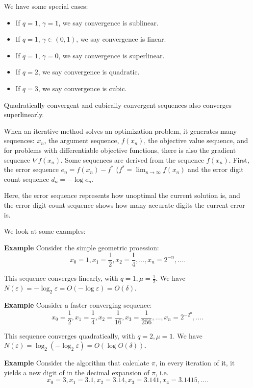 We have some special cases:
\begin{itemize}
\item If \( q = 1 \), \( \gamma = 1 \), we say convergence is sublinear.
\item If \( q = 1 \), \( \gamma \in (0, 1) \), we say convergence is linear.
\item If \( q = 1 \), \( \gamma = 0 \), we say convergence is superlinear.
\item If \( q = 2 \), we say convergence is quadratic.
\item If \( q = 3 \), we say convergence is cubic.
\end{itemize}

Quadratically convergent and cubically convergent sequences also converges
superlinearly.

When an iterative method solves an optimization problem, it generates many
sequences: \( x_{n} \), the argument sequence, \( f(x_{n}) \), the objective
value sequence, and for problems with differentiable objective functions, there
is also the gradient sequence \( \nabla f(x_{n}) \). Some sequences are derived
from the sequence \( f(x_{n}) \). First, the error sequence \( e_{n} = f(x_{n})
- f^{*}\) (\( f^{*} = \lim_{n \to \infty} f(x_{n}) \) and the error digit count
sequence \( d_{n} = -\log e_{n} \).

Here, the error sequence represents how unoptimal the current solution is, and
the error digit count sequence shows how many accurate digits the current error
is.

We look at some examples:

\textbf{Example} Consider the simple geometric proession:
\[
  x_{0} = 1, x_{1} = \frac{1}{2}, x_{2} = \frac{1}{4}, \ldots , x_{n} =
  2^{-n},\ldots 
.\] 

This sequence converges linearly, with \( q = 1, \mu  = \frac{1}{2} \). We have
\( N(\varepsilon) = -\log _{2} \varepsilon = O(-\log \varepsilon) = O(\delta) \).

\textbf{Example} Consider a faster converging sequence:
\[
  x_{0} = \frac{1}{2}, x_{1} = \frac{1}{4}, x_{2} = \frac{1}{16}, x_{3} =
  \frac{1}{256}, \ldots ,x_{n} = 2^{-2^{n}}, \ldots 
.\] 

This sequence converges quadratically, with \( q = 2, \mu  = 1 \). We have \(
N(\varepsilon) = \log_{2} (-\log _{2} \varepsilon) = O(\log O(\delta)) \).

\textbf{Example} Consider the algorithm that calculate \( \pi  \), in every
iteration of it, it yields a new digit of in the decimal expansion of \( \pi
\), i.e.
\[
  x_{0} = 3, x_{1} = 3.1, x_{2} = 3.14, x_{3} = 3.141, x_{4} = 3.1415,\ldots 
.\] 

